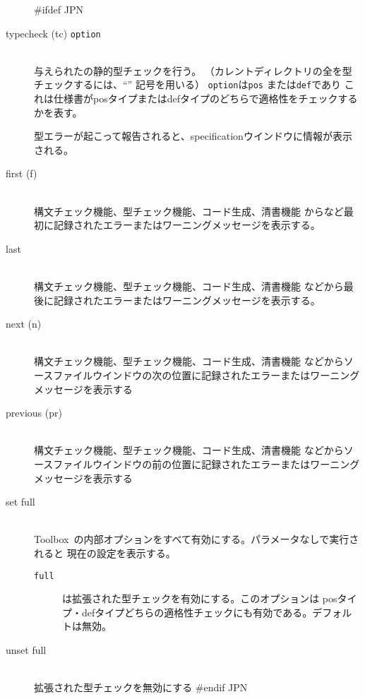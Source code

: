 \documentclass[\pformat,12pt]{article}
\newcommand{\Toolbox}{Toolbox}
\newcommand{\Toolbox}{Toolbox}
\begin{document}
\begin{description}
#ifdef JPN
\item[typecheck (tc) \ifthenelse{\boolean{VDMsl}}{{[}{\tt
      module}{]}}{{\tt class}} {\tt option}]\mbox{}\\ 
  与えられたの静的型チェックを行う。
  （カレントディレクトリの全を型チェックするには、``{\tt *}'' 記号を用いる）
  {\tt option}は{\tt pos} または{\tt def}であり
  これは仕様書がposタイプまたはdefタイプのどちらで適格性をチェックするかを表す。

  型エラーが起こって報告されると、specificationウインドウに情報が表示される。

\item[first (f)] \mbox{}\\
  構文チェック機能、型チェック機能、コード生成、清書機能
  からなど最初に記録されたエラーまたはワーニングメッセージを表示する。

\item[last] \mbox{}\\
  構文チェック機能、型チェック機能、コード生成、清書機能
  などから最後に記録されたエラーまたはワーニングメッセージを表示する。

\item[next (n) \index{nextコマンド}]\mbox{}\\
  構文チェック機能、型チェック機能、コード生成、清書機能
  などからソースファイルウインドウの次の位置に記録されたエラーまたはワーニングメッセージを表示する

\item[previous (pr)] \mbox{}\\
  構文チェック機能、型チェック機能、コード生成、清書機能
  などからソースファイルウインドウの前の位置に記録されたエラーまたはワーニングメッセージを表示する

\item[set full]\mbox{}\\
\Toolbox\ の内部オプションをすべて有効にする。パラメータなしで実行されると
現在の設定を表示する。
  \begin{description}
    \item[{\tt full}]は拡張された型チェックを有効にする。このオプションは
      posタイプ・defタイプどちらの適格性チェックにも有効である。デフォルトは無効。
  \end{description}
\item[unset full]\mbox{}\\
  拡張された型チェックを無効にする
#endif JPN
\end{description}
\end{document}
